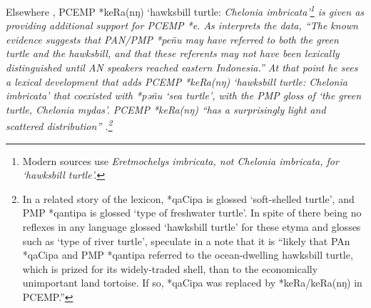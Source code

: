 Elsewhere \citep[46]{Blust2009},
PCEMP *keRa(nŋ) ‘hawksbill turtle: \it{Chelonia imbricata}’\footnote{
		Modern sources use \it{Eretmochelys imbricata}, not \it{Chelonia
		imbricata}, for ‘hawksbill turtle’.}
is given as providing additional
support for PCEMP *e.
As \citet[45]{Blust2009} interprets the data,
“The known evidence suggests that PAN/PMP *peñu may have referred
to both the green turtle
and the hawksbill, and that these referents may not have been
lexically distinguished until AN speakers reached eastern Indonesia.”
At that point he sees a lexical development that adds PCEMP *keRa(nŋ)
‘hawksbill turtle: \it{Chelonia imbricata}’ that coexisted with
 *pəñu ‘sea turtle’,
with the PMP gloss of ‘the green turtle, \it{Chelonia mydas’}.
PCEMP *keRa(nŋ) “has a surprisingly light
and scattered distribution” \citeyear[46]{Blust2009}.\footnote{
		In a related
		story of the lexicon,
		 *qaCipa is glossed ‘soft-shelled turtle’,
		and PMP *qantipa is glossed ‘type of freshwater turtle’.
		In spite of there being no reflexes in any language glossed ‘hawksbill
		turtle’ for these etyma
		and glosses such as ‘type of river turtle’,
		\citet{BlustTrussel2020} speculate in a note that it is “likely
		that PAn *qaCipa and PMP *qantipa referred to the ocean-dwelling hawksbill turtle,
		which is prized for its widely-traded shell,
		than to the economically unimportant land tortoise.
		If so, *qaCipa was replaced by *keRa/keRa(nŋ) in PCEMP.”}


